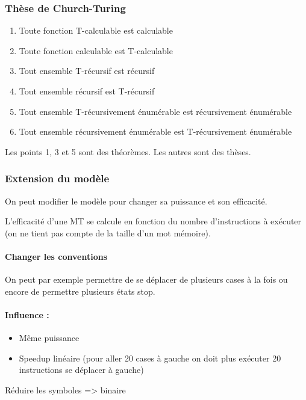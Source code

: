 \subsubsection{Thèse de Church-Turing}
\begin{enumerate}
	\item Toute fonction T-calculable est calculable
	\item Toute fonction calculable est T-calculable
	\item Tout ensemble T-récursif est récursif
	\item Tout ensemble récursif est T-récursif
	\item Tout ensemble T-récursivement énumérable est récursivement 
		énumérable
	\item Tout ensemble récursivement énumérable est T-récursivement 
		énumérable
\end{enumerate}
Les points 1, 3 et 5 sont des théorèmes. Les autres sont des thèses.

\subsubsection{Extension du modèle}
On peut modifier le modèle pour changer sa puissance et son efficacité.

\begin{mydef} L'efficacité d'une MT se calcule en 
	fonction du nombre d'instructions à exécuter (on ne tient pas compte de 
	la taille d'un mot mémoire).
\end{mydef}

\paragraph{Changer les conventions}
On peut par exemple permettre de se déplacer de plusieurs cases à la fois ou 
encore de permettre plusieurs états stop.

\paragraph{Influence :} 
\begin{itemize}
	\item Même puissance
	\item Speedup linéaire (pour aller 20 cases à gauche on doit plus 
		exécuter 20 instructions se déplacer à gauche)
\end{itemize}

Réduire les symboles => binaire

